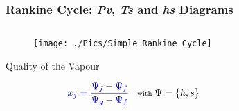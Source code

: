 \documentclass[10pt,compress,handout,unknownkeysallowed]{beamer}
\begin{document}
\begin{frame}
 \frametitle{Rankine Cycle: {\it Pv}, {\it Ts} and {\it hs} Diagrams}
 \begin{columns}
%
   \begin{column}[l]{0.45\linewidth}
    \begin{figure}%
     \begin{center}
      \texttt{[image: ./Pics/Simple\_Rankine\_Cycle]}
     \end{center}
    \end{figure} 
    \begin{block}{\begin{center}Quality of the Vapour\end{center}}
       \begin{equation}\scriptsize
         \textcolor{blue}{x_{j} = \displaystyle\frac{\Psi_{j}-\Psi_{f}}{\Psi_{g}-\Psi_{f}}} \;\;\;\text{with }\Psi=\left\{h,s\right\}
       \end{equation}
    \end{block}
   \end{column}
%
   \begin{column}[c]{0.55\linewidth}
    \begin{figure}%
     \begin{center}
     \end{center}
    \end{figure}  
   \end{column}
  \end{columns}
\end{frame}
\end{document}
